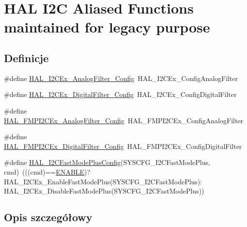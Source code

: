 \hypertarget{group___h_a_l___i2_c___aliased___functions}{}\section{H\+AL I2C Aliased Functions maintained for legacy purpose}
\label{group___h_a_l___i2_c___aliased___functions}
\subsection*{Definicje}
\begin{DoxyCompactItemize}
\item 
\#define \hyperlink{group___h_a_l___i2_c___aliased___functions_ga29a6d7298eb9b8290229e37a6eee9c21}{H\+A\+L\+\_\+\+I2\+C\+Ex\+\_\+\+Analog\+Filter\+\_\+\+Config}~H\+A\+L\+\_\+\+I2\+C\+Ex\+\_\+\+Config\+Analog\+Filter
\item 
\#define \hyperlink{group___h_a_l___i2_c___aliased___functions_gad145cb83d816a71f5f8085e5abb9cf8a}{H\+A\+L\+\_\+\+I2\+C\+Ex\+\_\+\+Digital\+Filter\+\_\+\+Config}~H\+A\+L\+\_\+\+I2\+C\+Ex\+\_\+\+Config\+Digital\+Filter
\item 
\#define \hyperlink{group___h_a_l___i2_c___aliased___functions_gab58dc8da5184549e6b0ada3895968b2d}{H\+A\+L\+\_\+\+F\+M\+P\+I2\+C\+Ex\+\_\+\+Analog\+Filter\+\_\+\+Config}~H\+A\+L\+\_\+\+F\+M\+P\+I2\+C\+Ex\+\_\+\+Config\+Analog\+Filter
\item 
\#define \hyperlink{group___h_a_l___i2_c___aliased___functions_ga26c863f7dd300fa407da0a808888c8d2}{H\+A\+L\+\_\+\+F\+M\+P\+I2\+C\+Ex\+\_\+\+Digital\+Filter\+\_\+\+Config}~H\+A\+L\+\_\+\+F\+M\+P\+I2\+C\+Ex\+\_\+\+Config\+Digital\+Filter
\item 
\#define \hyperlink{group___h_a_l___i2_c___aliased___functions_ga340e0d97db96b108c18718d4b37bdb29}{H\+A\+L\+\_\+\+I2\+C\+Fast\+Mode\+Plus\+Config}(S\+Y\+S\+C\+F\+G\+\_\+\+I2\+C\+Fast\+Mode\+Plus,  cmd)~(((cmd)==\hyperlink{group___exported__types_ggac9a7e9a35d2513ec15c3b537aaa4fba1a7d46875fa3ebd2c34d2756950eda83bf}{E\+N\+A\+B\+LE})? H\+A\+L\+\_\+\+I2\+C\+Ex\+\_\+\+Enable\+Fast\+Mode\+Plus(S\+Y\+S\+C\+F\+G\+\_\+\+I2\+C\+Fast\+Mode\+Plus)\+: H\+A\+L\+\_\+\+I2\+C\+Ex\+\_\+\+Disable\+Fast\+Mode\+Plus(S\+Y\+S\+C\+F\+G\+\_\+\+I2\+C\+Fast\+Mode\+Plus))
\end{DoxyCompactItemize}


\subsection{Opis szczegółowy}


